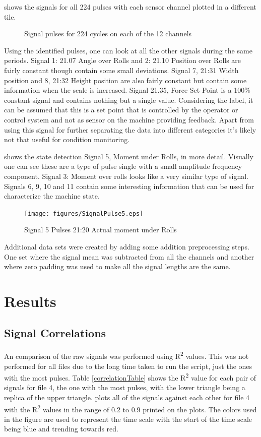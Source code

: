 \documentclass[]{article}
\begin{document}
 shows the signals for all 224 pulses with each sensor channel plotted in a different tile. 
\begin{figure}[H]
    \caption{Signal pulses for 224 cycles on each of the 12 channels}
    \label{fig:SignalPulses}
\end{figure}

Using the identified pulses, one can look at all the other signals during the same periods. Signal 1: 21.07 Angle over Rolls and 2: 21.10 Position over Rolls are fairly constant though contain some small deviations. Signal 7, 21:31 Width position and 8, 21:32 Height position are also fairly constant but contain some information when the scale is increased. Signal 21.35, Force Set Point is a 100\% constant signal and contains nothing but a single value. Considering the label, it can be assumed that this is a set point that is controlled by the operator or control system and not as sensor on the machine providing feedback. Apart from using this signal for further separating the data into different categories it's likely not that useful for condition monitoring.

 shows the state detection Signal 5, Moment under Rolls, in more detail. Visually one can see these are a type of pulse single with a small amplitude frequency component. Signal 3: Moment over rolls looks like a very similar type of signal. Signals 6, 9, 10 and 11 contain some interesting information that can be used for characterize the machine state.

\begin{figure}[H]
    \centering
    \texttt{[image: figures/SignalPulse5.eps]}
    \caption{Signal 5 Pulses 21:20 Actual moment under Rolls}
    \label{fig:SignalPulse5}
\end{figure}

Additional data sets were created by adding some addition preprocessing steps. One set where the signal mean was subtracted from all the channels and another where zero padding was used to make all the signal lengths are the same. 

\section{Results}
\subsection{Signal Correlations}
An comparison of the raw signals was performed using R\textsuperscript{2} values. This was not performed for all files due to the long time taken to run the script, just the ones with the most pulses. Table \ref{correlationTable} shows the R\textsuperscript{2} value for each pair of signals for file 4, the one with the most pulses, with the lower triangle being a replica of the upper triangle.  plots all of the signals against each other for file 4 with the R\textsuperscript{2} values in the range of 0.2 to 0.9 printed on the plots. The colors used in the figure are used to represent the time scale with the start of the time scale being blue and trending towards red.
\end{document}
